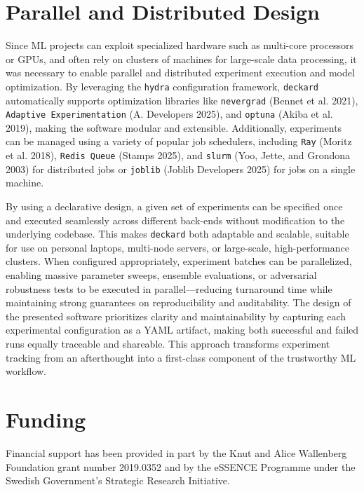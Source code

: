 \documentclass[
]{article}
\begin{document}
\hypertarget{parallel-and-distributed-design}{%
\section{Parallel and Distributed
Design}\label{parallel-and-distributed-design}}

Since ML projects can exploit specialized hardware such as multi-core
processors or GPUs, and often rely on clusters of machines for
large-scale data processing, it was necessary to enable parallel and
distributed experiment execution and model optimization. By leveraging
the \texttt{hydra} configuration framework, \texttt{deckard}
automatically supports optimization libraries like \texttt{nevergrad}
(Bennet et al. 2021), \texttt{Adaptive\ Experimentation} (A. Developers
2025), and \texttt{optuna} (Akiba et al. 2019), making the software
modular and extensible. Additionally, experiments can be managed using a
variety of popular job schedulers, including \texttt{Ray} (Moritz et al.
2018), \texttt{Redis\ Queue} (Stamps 2025), and \texttt{slurm} (Yoo,
Jette, and Grondona 2003) for distributed jobs or \texttt{joblib} (Joblib
Developers 2025) for jobs on a single machine.

By using a declarative design, a given set of experiments can be
specified once and executed seamlessly across different back-ends without
modification to the underlying codebase. This makes \texttt{deckard}
both adaptable and scalable, suitable for use on personal laptops,
multi-node servers, or large-scale, high-performance clusters. When
configured appropriately, experiment batches can be parallelized,
enabling massive parameter sweeps, ensemble evaluations, or adversarial
robustness tests to be executed in parallel---reducing turnaround time
while maintaining strong guarantees on reproducibility and auditability.
The design of the presented software prioritizes clarity and
maintainability by capturing each experimental configuration as a YAML
artifact, making both successful and failed runs equally traceable and
shareable. This approach transforms experiment tracking from an
afterthought into a first-class component of the trustworthy ML
workflow.

\hypertarget{funding}{%
\section{Funding}\label{funding}}

Financial support has been provided in part by the Knut and Alice
Wallenberg Foundation grant number 2019.0352 and by the eSSENCE
Programme under the Swedish Government's Strategic Research Initiative.
\end{document}
